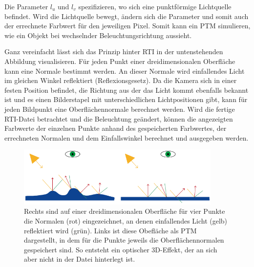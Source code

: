 Die Parameter $l_u$ und $l_v$ spezifizieren, wo sich eine punktförmige Lichtquelle befindet. Wird die Lichtquelle bewegt, ändern sich die Parameter und somit auch der errechnete Farbwert für den jeweiligen Pixel. Somit kann ein PTM simulieren, wie ein Objekt bei wechselnder Beleuchtungsrichtung aussieht.

Ganz vereinfacht lässt sich das Prinzip hinter RTI in der untenstehenden Abbildung visualisieren. Für jeden Punkt einer dreidimensionalen Oberfläche kann eine Normale bestimmt werden. An dieser Normale wird einfallendes Licht im gleichen Winkel reflektiert (Reflexionsgesetz). Da die Kamera sich in einer festen Position befindet, die Richtung aus der das Licht kommt ebenfalls bekannt ist und es einen Bilderstapel mit unterschiedlichen Lichtpositionen gibt, kann für jeden Bildpunkt eine Oberflächennormale berechnet werden. Wird die fertige RTI-Datei betrachtet und die Beleuchtung geändert, können die angezeigten Farbwerte der einzelnen Punkte anhand des gespeicherten Farbwertes, der errechneten Normalen und dem Einfallswinkel berechnet und ausgegeben werden.

\begin{figure}[!hpt]
  \begin{center}
    \includegraphics[width=0.9\textwidth]{bilder/rti_ptmAbstrakt}
  \end{center}
  \caption{Rechts sind auf einer dreidimensionalen Oberfläche für vier Punkte die Normalen (rot) eingezeichnet, an denen einfallendes Licht (gelb) reflektiert wird (grün). Links ist diese Obefläche als PTM dargestellt, in dem für die Punkte jeweils die Oberflächennormalen gespeichert sind. So entsteht ein optischer 3D-Effekt, der an sich aber nicht in der Datei hinterlegt ist.}
\end{figure}

